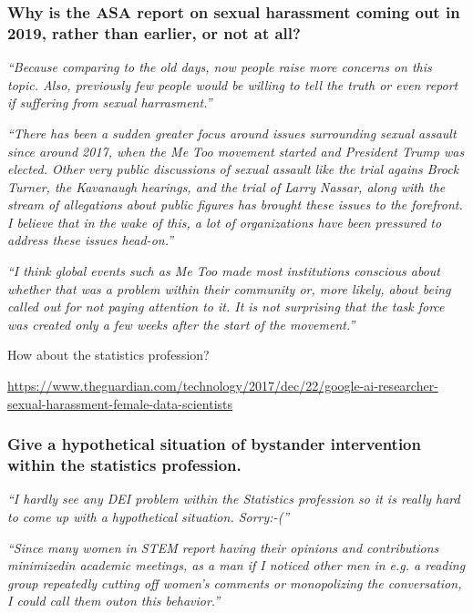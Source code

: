 \documentclass[12pt]{beamer}
\newcommand\ans[1]{{\it ``#1''}}
\newcommand\gap{\vspace{5mm}}
\begin{document}
\begin{frame}   %

  \frametitle{Why is the ASA report on sexual harassment coming out in 2019, rather than earlier, or not at all?}


  \ans{Because comparing to the old days, now people raise more concerns on this topic.  Also, previously few people would be willing to tell the truth or even report if suffering from sexual harrasment.}

\gap

  \ans{There has been a sudden greater focus around issues surrounding sexual assault since around 2017, when the Me Too movement started and President Trump was elected. Other very public discussions of sexual assault like the trial agains Brock Turner, the Kavanaugh hearings, and the trial of Larry Nassar, along with the stream of allegations about public figures has brought these issues to the forefront.  I believe that in the wake of this, a lot of organizations have been pressured to address these issues head-on.}
  
\end{frame}

\begin{frame}

  \ans{I think global events such as Me Too made most institutions conscious about whether that was a problem within their community or, more likely, about being called out for not paying attention to it.  It is not surprising that the task force was created only a few weeks after the start of the movement.}

  \gap

  How about the statistics profession?
  \gap
  
\url{https://www.theguardian.com/technology/2017/dec/22/google-ai-researcher-sexual-harassment-female-data-scientists}

\end{frame}




\begin{frame}   %
  
  \frametitle{Give a hypothetical situation of bystander intervention within the statistics profession.}


  \ans{I hardly see any DEI problem within the Statistics profession so it is really hard to come up with a hypothetical situation. Sorry:-(}

  \gap
  
\ans{Since many women in STEM report having their opinions and contributions minimizedin academic meetings, as a man if I noticed other men in e.g. a reading group repeatedly cutting off women’s comments or monopolizing the conversation, I could call them outon this behavior.}
  
\end{frame}
\end{document}
